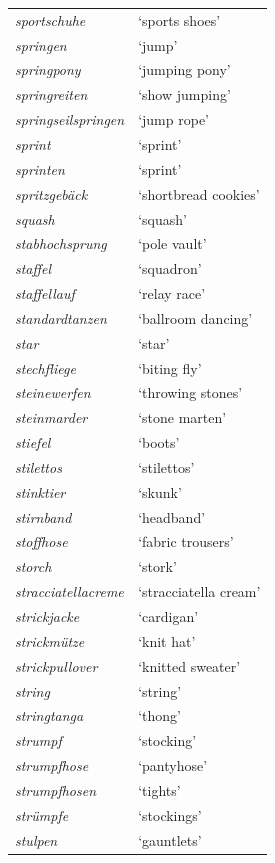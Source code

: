 \begin{longtable}{ll}
\textit{sportschuhe} & `sports shoes' \\
\textit{springen} & `jump' \\
\textit{springpony} & `jumping pony' \\
\textit{springreiten} & `show jumping' \\
\textit{springseilspringen} & `jump rope' \\
\textit{sprint} & `sprint' \\
\textit{sprinten} & `sprint' \\
\textit{spritzgebäck} & `shortbread cookies' \\
\textit{squash} & `squash' \\
\textit{stabhochsprung} & `pole vault' \\
\textit{staffel} & `squadron' \\
\textit{staffellauf} & `relay race' \\
\textit{standardtanzen} & `ballroom dancing' \\
\textit{star} & `star' \\
\textit{stechfliege} & `biting fly' \\
\textit{steinewerfen} & `throwing stones' \\
\textit{steinmarder} & `stone marten' \\
\textit{stiefel} & `boots' \\
\textit{stilettos} & `stilettos' \\
\textit{stinktier} & `skunk' \\
\textit{stirnband} & `headband' \\
\textit{stoffhose} & `fabric trousers' \\
\textit{storch} & `stork' \\
\textit{stracciatellacreme} & `stracciatella cream' \\
\textit{strickjacke} & `cardigan' \\
\textit{strickmütze} & `knit hat' \\
\textit{strickpullover} & `knitted sweater' \\
\textit{string} & `string' \\
\textit{stringtanga} & `thong' \\
\textit{strumpf} & `stocking' \\
\textit{strumpfhose} & `pantyhose' \\
\textit{strumpfhosen} & `tights' \\
\textit{strümpfe} & `stockings' \\
\textit{stulpen} & `gauntlets' \\

\end{longtable}
